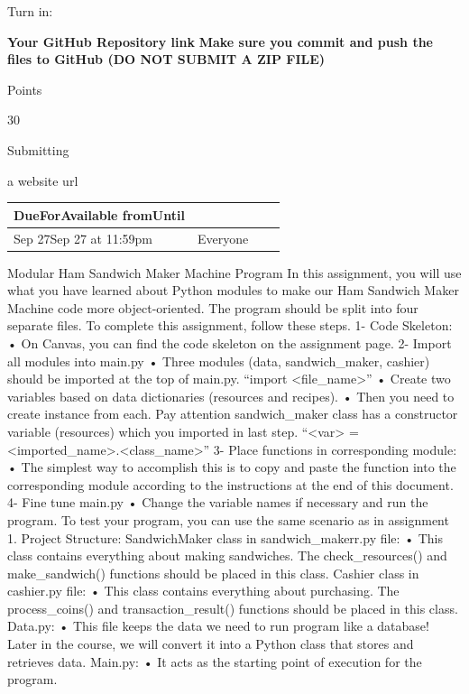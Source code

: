 \documentclass[
]{article}
\begin{document}
Turn in:

\textbf{Your GitHub Repository link} \textbf{Make sure you commit and
push the files to GitHub (DO NOT SUBMIT A ZIP FILE)}

Points

30

Submitting

a website url

\begin{longtable}[]{@{}llll@{}}
\toprule\noalign{}
DueForAvailable fromUntil & & & \\
\midrule\noalign{}
\endhead
\bottomrule\noalign{}
\endlastfoot
Sep 27Sep 27 at 11:59pm & Everyone & & \\
\end{longtable}

Modular Ham Sandwich Maker Machine Program In this assignment, you will
use what you have learned about Python modules to make our Ham Sandwich
Maker Machine code more object-oriented. The program should be split
into four separate files. To complete this assignment, follow these
steps. 1- Code Skeleton: • On Canvas, you can find the code skeleton on
the assignment page. 2- Import all modules into main.py • Three modules
(data, sandwich\_maker, cashier) should be imported at the top of
main.py. ``import \textless file\_name\textgreater'' • Create two
variables based on data dictionaries (resources and recipes). • Then you
need to create instance from each. Pay attention sandwich\_maker class
has a constructor variable (resources) which you imported in last step.
``\textless var\textgreater{} =
\textless imported\_name\textgreater.\textless class\_name\textgreater''
3- Place functions in corresponding module: • The simplest way to
accomplish this is to copy and paste the function into the corresponding
module according to the instructions at the end of this document. 4-
Fine tune main.py • Change the variable names if necessary and run the
program. To test your program, you can use the same scenario as in
assignment 1. Project Structure: SandwichMaker class in
sandwich\_makerr.py file: • This class contains everything about making
sandwiches. The check\_resources() and make\_sandwich() functions should
be placed in this class. Cashier class in cashier.py file: • This class
contains everything about purchasing. The process\_coins() and
transaction\_result() functions should be placed in this class. Data.py:
• This file keeps the data we need to run program like a database! Later
in the course, we will convert it into a Python class that stores and
retrieves data. Main.py: • It acts as the starting point of execution
for the program.
\end{document}
